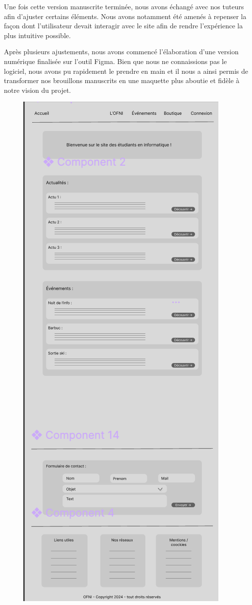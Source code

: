 Une fois cette version manuscrite terminée, nous avons échangé avec nos tuteurs afin d’ajuster certains éléments.
Nous avons notamment été amenés à repenser la façon dont l'utilisateur devait interagir avec le site afin de rendre l'expérience la plus intuitive possible.


Après plusieurs ajustements, nous
avons commencé l'élaboration d'une version numérique finalisée sur l'outil Figma.
Bien que nous ne connaissions pas le logiciel, nous avons pu rapidement le prendre en main et il nous a ainsi permis de transformer nos brouillons manuscrits en une maquette plus aboutie et fidèle à notre vision du projet.

\begin{figure}[H]
    \centering
    \includegraphics[scale=0.4]{assets/pictures/figma.png}

\end{figure}
